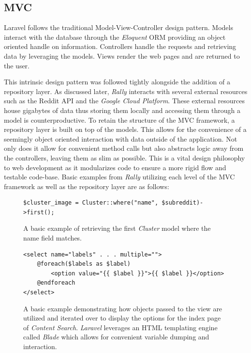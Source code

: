 \documentclass[msc,oneside]{ubcthesis}%
\begin{document}
\subsection{MVC}
Laravel follows the traditional Model-View-Controller design pattern. Models interact with the database through the \textit{Eloquent} ORM providing an object oriented handle on information. Controllers handle the requests and retrieving data by leveraging the models. Views render the web pages and are returned to the user.
\par
This intrinsic design pattern was followed tightly alongside the addition of a repository layer. As discussed later, \textit{Rally} interacts with several external resources such as the Reddit API and the \textit{Google Cloud Platform}. These external resources house gigabytes of data thus storing them locally and accessing them through a model is counterproductive. To retain the structure of the MVC framework, a repository layer is built on top of the models. This allows for the convenience of a seemingly object oriented interaction with data outside of the application. Not only does it allow for convenient method calls but also abstracts logic away from the controllers, leaving them as slim as possible. This is a vital design philosophy to web development as it modularizes code to ensure a more rigid flow and testable code-base. Basic examples from \textit{Rally} utilizing each level of the MVC framework as well as the repository layer are as follows:
\par{}
\begin{figure}[!htb]
\begin{center}
\begin{lstlisting}
$cluster_image = Cluster::where("name", $subreddit)->first();
\end{lstlisting}
\end{center}
\caption[Example of Model]{
A basic example of retrieving the first \textit{Cluster} model where the name field matches.}
\end{figure}

\begin{figure}[!htb]
\begin{lstlisting}
<select name="labels" . . . multiple="">
	@foreach($labels as $label)
		<option value="{{ $label }}">{{ $label }}</option>
	@endforeach
</select>
\end{lstlisting}
\caption[Example of View]{
A basic example demonstrating how objects passed to the view are utilized and iterated over to display the options for the index page of \textit{Content Search}. \textit{Laravel} leverages an HTML templating engine called \textit{Blade} which allows for convenient variable dumping and interaction.}
\end{figure}
\end{document}
